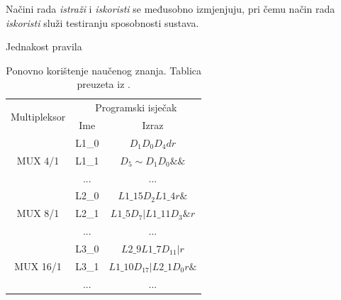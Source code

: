 \documentclass[times, utf8, zavrsni]{fer}
\begin{document}
Načini rada \emph{istraži} i \emph{iskoristi} se međusobno izmjenjuju, pri čemu način rada \emph{iskoristi} služi testiranju sposobnosti sustava.

\begin{algorithm}[h]
    \caption{Jednakost pravila}
    \label{alg:eq}
    \begin{algorithmic}
        \ENDIF
        \ENDIF
        \ENDIF
    \end{algorithmic}
\end{algorithm}

\begin{table}[!hb]
    \caption{Ponovno korištenje naučenog znanja. Tablica preuzeta iz \citep{4}.}
    \label{tbl:reuse}
    \centering
    \begin{tabular}{c | c | c}
        \multirow{2}{*}{Multipleksor} & \multicolumn{2}{c}{Programski isječak} \\
        & Ime & Izraz \\ \hline
        \multirow{3}{*}{MUX 4/1} & L1\_0 & $D_{1}D_{0}D_{4}dr$ \\
        & L1\_1 & $D_{5}\sim D_{1}D_{0}\&\&$ \\
        & ... & ... \\ \hline
        \multirow{3}{*}{MUX 8/1} & L2\_0 & $L1\_15D_{2}L1\_4r\&$ \\
        & L2\_1 & $L1\_5D_{7}|L1\_11D_{3}\&r$ \\
        & ... & ... \\ \hline
        \multirow{3}{*}{MUX 16/1} & L3\_0 & $L2\_9L1\_7D_{11}|r$ \\
        & L3\_1 & $L1\_10D_{17}|L2\_1D_{0}r\&$ \\
        & ... & ... \\
    \end{tabular}
\end{table}
\end{document}
